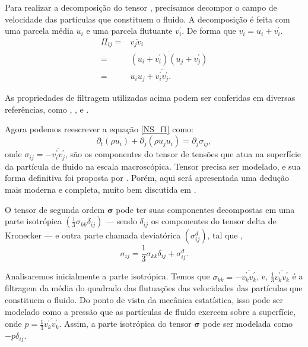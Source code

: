 Para realizar a decomposição do tensor \boldsymbol{\Pi}, precisamos decompor o campo de velocidade das partículas que constituem o fluido. A decomposição é feita com uma parcela média $u_{i}$ e uma parcela flutuante $v^{'}_{i}$. De forma que $v_{i} = u_{i} + v^{'}_{i}$.
\begin{equation}
\begin{split}
\Pi_{ij} = & \overline{v_{j}v_{i}} \\
= &\overline{(u_{i} + v^{'}_{i})(u_{j} + v^{'}_{j})} \\
=& u_{i}u_{j} + \overline{v^{'}_{i}v^{'}_{j}}.
\end{split}
\end{equation}

As propriedades de filtragem utilizadas acima podem ser conferidas em diversas referências, como \cite{catta2018implementaccao}, \cite{sagaut2006large}, \cite{pitaevskii2012physical} e \cite{pope2000turbulent}.

Agora podemos reescrever a equação \ref{NS_f1} como: 
\begin{equation}\label{NS_f2}
\partial_{t}(\rho u_{i})+ \partial_{j} (\rho u_{j}u_{i})= \partial_{j} \sigma_{ij},
\end{equation}
onde $\sigma_{ij} = -\overline{v^{'}_{i}v^{'}_{j}}$, são os componentes do tensor de tensões que atua na superfície da partícula de fluido na escala macroscópica. Tensor \boldsymbol{\sigma} precisa ser modelado, e sua forma definitiva foi proposta por \cite{stokes2007theories}. Porém, aqui será apresentada uma dedução mais moderna e completa, muito bem discutida em \cite{batchelor2000introduction}.

O tensor de segunda ordem $\boldsymbol{\sigma}$ pode ter suas componentes decompostas em uma parte isotrópica $(\frac{1}{3}\sigma_{kk}\delta_{ij})$ — sendo $\delta_{ij}$ os componentes do tensor delta de Kronecker — e outra parte chamada deviatórica $(\sigma^{d}_{ij})$, tal que \cite{batchelor2000introduction}, 
\begin{equation}\label{sigma_1}
\sigma_{ij} = \frac{1}{3}\sigma_{kk}\delta_{ij} + \sigma^{d}_{ij}.
\end{equation}

Analisaremos inicialmente a parte isotrópica. Temos que $\sigma_{kk} = -\overline{v^{'}_{k}v^{'}_{k}}$, e, $\frac{1}{3}\overline{v^{'}_{k}v^{'}_{k}}$ é a filtragem da média do quadrado das flutuações das velocidades das partículas que constituem o fluido. Do ponto de vista da mecânica estatística, isso pode ser modelado como a pressão que as partículas de fluido exercem sobre a superfície, onde $p = \frac{1}{3}\overline{v^{'}_{k}v^{'}_{k}}$. Assim, a parte isotrópica do tensor $\boldsymbol{\sigma}$ pode ser modelada como $-p\delta_{ij}$.

